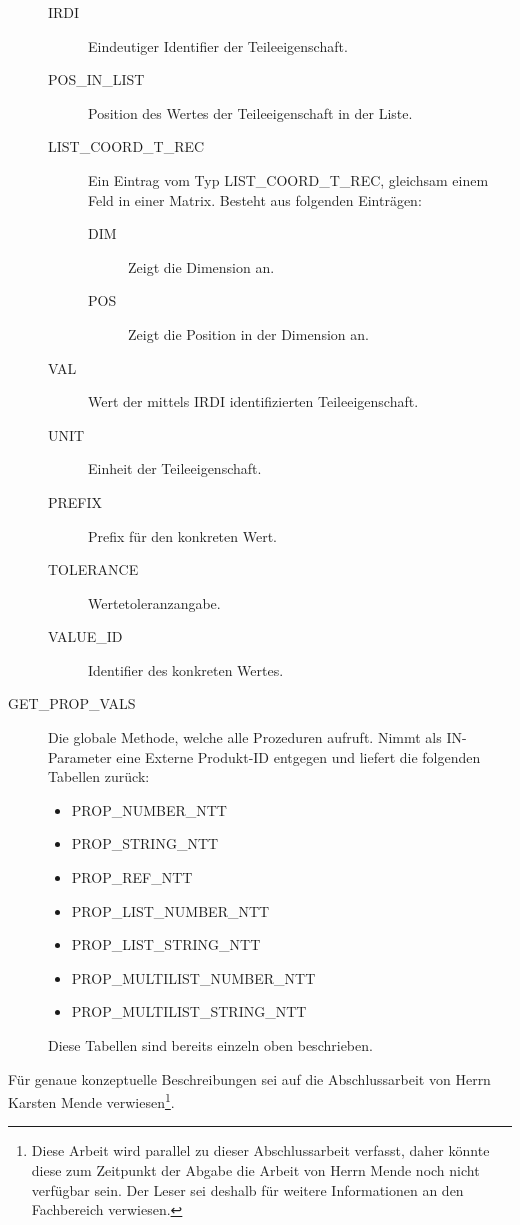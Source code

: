 \begin{description}
  \begin{description}
  \item[IRDI] Eindeutiger Identifier der Teileeigenschaft.
  \item[POS\_IN\_LIST] Position des Wertes der Teileeigenschaft in der Liste.
  \item[LIST\_COORD\_T\_REC] Ein Eintrag vom Typ LIST\_COORD\_T\_REC, gleichsam einem Feld in einer Matrix. Besteht aus folgenden Einträgen:
    \begin{description}	
    \item[DIM] Zeigt die Dimension an.
    \item[POS] Zeigt die Position in der Dimension an. 
    \end{description}
  \item[VAL] Wert der mittels IRDI identifizierten Teileeigenschaft.
  \item[UNIT] Einheit der Teileeigenschaft.
  \item[PREFIX] Prefix für den konkreten Wert.
  \item[TOLERANCE] Wertetoleranzangabe.
  \item[VALUE\_ID] Identifier des konkreten Wertes.
  \end{description}
\item[GET\_PROP\_VALS] Die globale Methode, welche alle Prozeduren aufruft. Nimmt als IN-Parameter eine Externe Produkt-ID entgegen und liefert die folgenden Tabellen zurück:
\begin{itemize}
\item PROP\_NUMBER\_NTT
\item PROP\_STRING\_NTT
\item PROP\_REF\_NTT
\item PROP\_LIST\_NUMBER\_NTT
\item PROP\_LIST\_STRING\_NTT
\item PROP\_MULTILIST\_NUMBER\_NTT
\item PROP\_MULTILIST\_STRING\_NTT
\end{itemize} 

Diese Tabellen sind bereits einzeln oben beschrieben. 
\end{description}

Für genaue konzeptuelle Beschreibungen sei auf die Abschlussarbeit von Herrn Karsten Mende verwiesen\footnote{Diese Arbeit wird parallel zu dieser Abschlussarbeit verfasst, daher könnte diese zum Zeitpunkt der Abgabe die Arbeit von Herrn Mende noch nicht verfügbar sein. Der Leser sei deshalb für weitere Informationen an den Fachbereich verwiesen.}.


